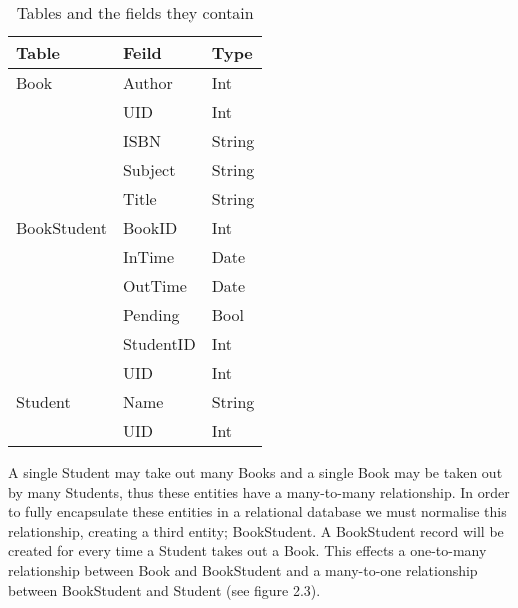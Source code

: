 \documentclass[draft]{book}
\begin{document}
\begin{table}[t]

    \centering

    \begin{tabu} to 0.7\linewidth {lXX}

        \toprule

        Table       & Feild     & Type   \\

        \midrule

        Book        & Author    & Int    \\
                    & UID       & Int    \\
                    & ISBN      & String \\
                    & Subject   & String \\
                    & Title     & String \\

        BookStudent & BookID    & Int    \\
                    & InTime    & Date   \\
                    & OutTime   & Date   \\
                    & Pending   & Bool   \\
                    & StudentID & Int    \\
                    & UID       & Int    \\

        Student     & Name      & String \\
                    & UID       & Int    \\

        \bottomrule

    \end{tabu}

    \caption[Data Dictionary]{Tables and the fields they contain}

\end{table}

\noindent A single Student may take out many Books and a single Book may be taken out 
by many Students, thus these entities have a many-to-many relationship. In 
order to fully encapsulate these entities in a relational database we must 
normalise this relationship, creating a third entity; BookStudent. A 
BookStudent record will be created for every time a Student takes out a 
Book. This effects a one-to-many relationship between Book and BookStudent 
and a many-to-one relationship between BookStudent and Student (see figure 
2.3).
\end{document}
